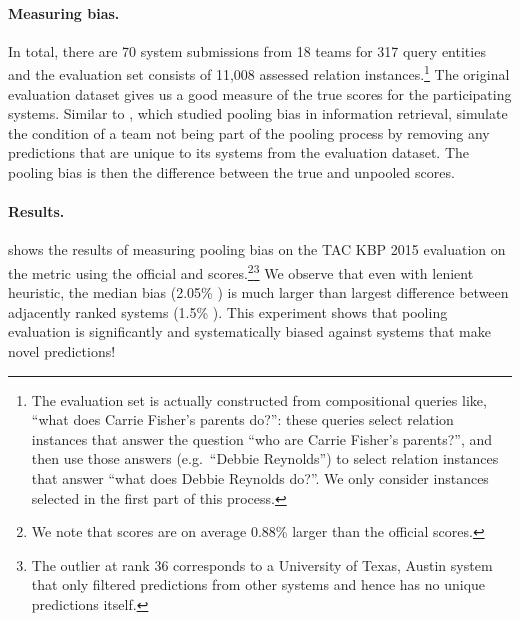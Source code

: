 \paragraph{Measuring bias.}
In total, there are 70 system submissions from 18 teams for 317 query entities and the evaluation set consists of 11,008 assessed relation instances.\footnote{%
  The evaluation set is actually constructed from compositional queries like, ``what does Carrie Fisher's parents do?'':
  these queries select relation instances that answer the question ``who are Carrie Fisher's parents?'', and then use those answers (e.g.\ ``Debbie Reynolds'') to select relation instances that answer ``what does Debbie Reynolds do?''.
  We only consider instances selected in the first part of this process.
}
The original evaluation dataset gives us a good measure of the true scores for the participating systems.
Similar to \citet{zobel1998reliable}, which studied pooling bias in information retrieval,
simulate the condition of a team not being part of the pooling process by removing any predictions that are unique to its systems from the evaluation dataset.
The pooling bias is then the difference between the true and unpooled scores.

\paragraph{Results.}
 shows the results of measuring pooling bias on the TAC KBP 2015 evaluation on the \fone{} metric using the official and \anydoc{} scores.\footnote{%
  We note that \anydoc{} scores are on average 0.88\%\fone{} larger than the official scores. 
  }\footnote{
  The outlier at rank 36 corresponds to a University of Texas, Austin system that only filtered predictions from other systems and hence has no unique predictions itself.
  }
We observe that even with lenient \anydoc{} heuristic, the median bias (2.05\% \fone{}) is much larger than largest difference between adjacently ranked systems (1.5\% \fone{}).
This experiment shows that pooling evaluation is significantly and systematically biased against systems that make novel predictions!


